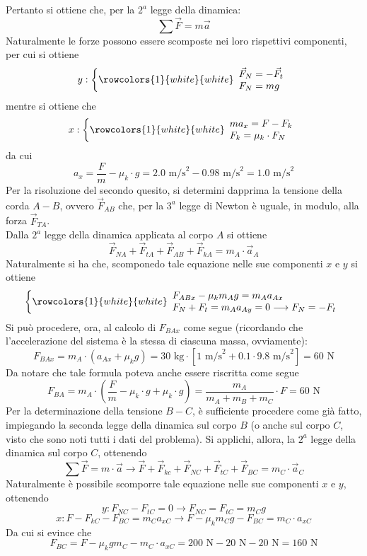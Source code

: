\documentclass[a4paper]{extarticle}
\begin{document}
\vspace{1em}
\noindent
Pertanto si ottiene che, per la $2^a$ legge della dinamica:
\[\sum \vec{F} = m \vec{a}\]
Naturalmente le forze possono essere scomposte nei loro rispettivi componenti, per cui si ottiene
\[
  y : \left\{
  \rowcolors{1}{white}{white}
  \begin{array}{l}
    \vec{F}_N = - \vec{F}_t\\
    F_N = mg
  \end{array}
  \right.
\]
mentre si ottiene che
\[
  x : \left\{
  \rowcolors{1}{white}{white}
  \begin{array}{l}
    m a_x = F - F_k\\
    F_k = \mu_k \cdot F_N
  \end{array}
  \right.
\]
da cui
\[a_x = \frac{F}{m} - \mu_k \cdot g = 2.0 \text{ m/s}^2 - 0.98 \text{ m/s}^2 = 1.0 \text{ m/s}^2\]
Per la risoluzione del secondo quesito, si determini dapprima la tensione della corda $A-B$, ovvero $\vec{F}_{AB}$ che, per la $3^a$ legge di Newton è uguale, in modulo, alla forza $\vec{F}_{TA}$.\\
Dalla $2^a$ legge della dinamica applicata al corpo $A$ si ottiene
\[\vec{F}_{NA} + \vec{F}_{tA} + \vec{F}_{AB} + \vec{F}_{kA} = m_A \cdot \vec{a}_A\]
Naturalmente si ha che, scomponedo tale equazione nelle sue componenti $x$ e $y$ si ottiene
\[
  \left\{
  \rowcolors{1}{white}{white}
  \begin{array}{l}
    F_{AB x} - \mu_k m_A g = m_A a_{A x}\\
    F_N + F_t = m_A a_{A y} = 0 \longrightarrow F_N = - F_t
  \end{array}
  \right.
\]
Si può procedere, ora, al calcolo di $F_{BA x}$ come segue (ricordando che l'accelerazione del sistema è la stessa di ciascuna massa, ovviamente):
\[F_{BA x} = m_A \cdot (a_{Ax} + \mu_k g) = 30 \text{ kg} \cdot \left[1 \text{ m/s}^2 + 0.1 \cdot 9.8 \text{ m/s}^2\right] = 60 \text{ N}\]
Da notare che tale formula poteva anche essere riscritta come segue
\[F_{BA} = m_A \cdot \left(\frac{F}{m} - \mu_k \cdot g + \mu_k \cdot g\right) = \frac{m_A}{m_A + m_B + m_C} \cdot F = 60 \text{ N}\]
Per la determinazione della tensione $B-C$, è sufficiente procedere come già fatto, impiegando la seconda legge della dinamica sul corpo $B$ (o anche sul corpo $C$, visto che sono noti tutti i dati del problema). Si applichi, allora, la $2^a$ legge della dinamica sul corpo $C$, ottenendo
\[\sum \vec{F} = m \cdot \vec{a} \longrightarrow \vec{F} + \vec{F}_{kc} + \vec{F}_{NC} + \vec{F}_{tC} + \vec{F}_{BC} = m_C \cdot \vec{a}_C\]
Naturalmente è possibile scomporre tale equazione nelle sue componenti $x$ e $y$, ottenendo
\[y : F_{NC} - F_{tC} = 0 \longrightarrow F_{NC} = F_{tC} = m_C g\]
\[x : F - F_{kC} - F_{BC} = m_C a_{xC} \longrightarrow F - \mu_k m_C g - F_{BC} = m_C \cdot a_{xC}\]
Da cui si evince che
\[F_{BC} = F - \mu_k g m_C - m_C \cdot a_{xC} = 200 \text{ N} - 20 \text{ N} - 20 \text{ N} = 160 \text{ N}\]
\end{document}
